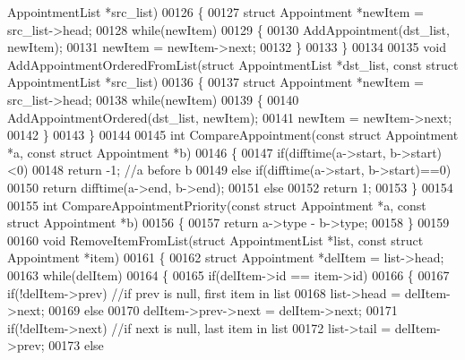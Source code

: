 \begin{DoxyCode}
      AppointmentList *src\_list)
00126 \{
00127     \textcolor{keyword}{struct }Appointment *newItem = src\_list->head;
00128     \textcolor{keywordflow}{while}(newItem)
00129     \{
00130         AddAppointment(dst\_list, newItem);
00131         newItem = newItem->next;
00132     \}
00133 \}
00134 
00135 \textcolor{keywordtype}{void} AddAppointmentOrderedFromList(\textcolor{keyword}{struct} AppointmentList *dst\_list, \textcolor{keyword}{const} \textcolor{keyword}{struct} 
      AppointmentList *src\_list)
00136 \{
00137     \textcolor{keyword}{struct }Appointment *newItem = src\_list->head;
00138     \textcolor{keywordflow}{while}(newItem)
00139     \{
00140         AddAppointmentOrdered(dst\_list, newItem);
00141         newItem = newItem->next;
00142     \}
00143 \}
00144 
00145 \textcolor{keywordtype}{int} CompareAppointment(\textcolor{keyword}{const} \textcolor{keyword}{struct} Appointment *a, \textcolor{keyword}{const} \textcolor{keyword}{struct} Appointment *b)
00146 \{
00147     \textcolor{keywordflow}{if}(difftime(a->start, b->start)<0)
00148         \textcolor{keywordflow}{return} -1;  \textcolor{comment}{//a before b}
00149     \textcolor{keywordflow}{else} \textcolor{keywordflow}{if}(difftime(a->start, b->start)==0)
00150         \textcolor{keywordflow}{return} difftime(a->end, b->end);
00151     \textcolor{keywordflow}{else}
00152         \textcolor{keywordflow}{return} 1;
00153 \}
00154 
00155 \textcolor{keywordtype}{int} CompareAppointmentPriority(\textcolor{keyword}{const} \textcolor{keyword}{struct} Appointment *a, \textcolor{keyword}{const} \textcolor{keyword}{struct} 
      Appointment *b)
00156 \{
00157     \textcolor{keywordflow}{return} a->type - b->type;
00158 \}
00159 
00160 \textcolor{keywordtype}{void} RemoveItemFromList(\textcolor{keyword}{struct} AppointmentList *list, \textcolor{keyword}{const} \textcolor{keyword}{struct} Appointment *item)
00161 \{
00162     \textcolor{keyword}{struct }Appointment *delItem = list->head;
00163     \textcolor{keywordflow}{while}(delItem)
00164     \{
00165         \textcolor{keywordflow}{if}(delItem->id == item->id)
00166         \{
00167             \textcolor{keywordflow}{if}(!delItem->prev)  \textcolor{comment}{//if prev is null, first item in list}
00168                 list->head = delItem->next;
00169             \textcolor{keywordflow}{else}
00170                 delItem->prev->next = delItem->next;
00171             \textcolor{keywordflow}{if}(!delItem->next)  \textcolor{comment}{//if next is null, last item in list}
00172                 list->tail = delItem->prev;
00173             \textcolor{keywordflow}{else}

\end{DoxyCode}
